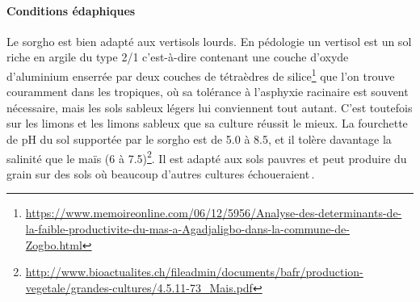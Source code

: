 \documentclass[a4paper,11pt]{article}
\begin{document}
\paragraph{Conditions édaphiques}
Le sorgho est bien adapté aux vertisols lourds. En pédologie un
vertisol est un sol riche en argile du type 2/1 c'est-à-dire contenant
une couche d'oxyde d'aluminium enserrée par deux couches de tétraèdres
de
silice\footnote{\url{https://www.memoireonline.com/06/12/5956/Analyse-des-determinants-de-la-faible-productivite-du-mas-a-Agadjaligbo-dans-la-commune-de-Zogbo.html}}
que l'on trouve couramment dans les tropiques, où sa tolérance à
l'asphyxie racinaire est souvent nécessaire, mais les sols sableux
légers lui conviennent tout autant. C'est toutefois sur les limons et
les limons sableux que sa culture réussit le mieux. La fourchette de
pH du sol supportée par le sorgho est de 5.0 à 8.5, et il tolère
davantage la salinité que le maïs (6 à
7.5)\footnote{\url{http://www.bioactualites.ch/fileadmin/documents/bafr/production-vegetale/grandes-cultures/4.5.11-73_Mais.pdf}}. Il
est adapté aux sols pauvres et peut produire du grain sur des sols où
beaucoup d'autres cultures échoueraient\,\cite{BARRO_KONDOMBO_2010}.
 
 
\end{document}
